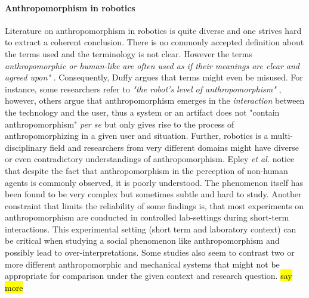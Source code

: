 \documentclass[lettersize, apacite, twoside, HRI]{apa_HRI}
\begin{document}
\paragraph{Anthropomorphism in robotics} Literature on anthropomorphism in robotics is quite diverse and one strives hard to extract a coherent conclusion. There is no commonly accepted definition about the terms used and the terminology is not clear. However the terms \textit{anthropomorphic or human-like are often used as if their meanings are clear and agreed upon"} \cite{persson_anthropomorphism_2000}. Consequently, Duffy \cite{duffy_anthropomorphism_2002} argues that terms might even be misused. For instance, some researchers refer to \textit{"the robot's level of anthropomorphism"} \cite{bartneck_is_2007}, however, others argue that anthropomorphism emerges in the \textit{interaction} between the technology and the user, thus a system or an artifact does not "contain anthropomorphism" \textit{per se} \cite{persson_anthropomorphism_2000} but only gives rise to the process of anthropomorphizing in a given user and situation. Further, robotics is a multi-disciplinary field and researchers from very different domains might have diverse or even contradictory understandings of anthropomorphism. Epley \textit{et al.} \cite{epley_seeing_2007} notice that despite the fact that anthropomorphism in the perception of non-human agents is commonly observed, it is poorly understood. The phenomenon itself has been found to be very complex but sometimes subtle and hard to study. Another constraint that limits the reliability of some findings is, that most experiments on anthropomorphism are conducted in controlled lab-settings during short-term interactions. This experimental setting (short term and laboratory context) can be critical when studying a social phenomenon like anthropomorphism and possibly lead to over-interpretations. Some studies also seem to contrast two or more different anthropomorphic and mechanical systems that might not be appropriate for comparison under the given context and research question. \hl{say more}
\end{document}
